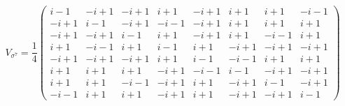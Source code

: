 \documentclass[a4paper]{article}
\begin{document}
  \begin{equation}
    V_{\sigma^7} = \frac{1}{4}
    \displaystyle \left(\begin{array}{rrrrrrrr}
i - 1 & -i + 1 & -i + 1 & i + 1 & -i + 1 & i + 1 & i + 1 & -i - 1 \\
-i + 1 & i - 1 & -i + 1 & -i - 1 & -i + 1 & i + 1 & i + 1 & i + 1 \\
-i + 1 & -i + 1 & i - 1 & i + 1 & -i + 1 & i + 1 & -i - 1 & i + 1 \\
i + 1 & -i - 1 & i + 1 & i - 1 & i + 1 & -i + 1 & -i + 1 & -i + 1 \\
-i + 1 & -i + 1 & -i + 1 & i + 1 & i - 1 & -i - 1 & i + 1 & i + 1 \\
i + 1 & i + 1 & i + 1 & -i + 1 & -i - 1 & i - 1 & -i + 1 & -i + 1 \\
i + 1 & i + 1 & -i - 1 & -i + 1 & i + 1 & -i + 1 & i - 1 & -i + 1 \\
-i - 1 & i + 1 & i + 1 & -i + 1 & i + 1 & -i + 1 & -i + 1 & i - 1
\end{array}\right)
  \end{equation}
\end{document}
